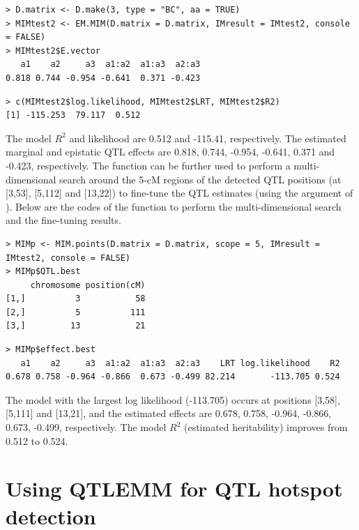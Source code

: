 \begin{verbatim}
> D.matrix <- D.make(3, type = "BC", aa = TRUE)
> MIMtest2 <- EM.MIM(D.matrix = D.matrix, IMresult = IMtest2, console = FALSE)
> MIMtest2$E.vector
   a1    a2     a3  a1:a2  a1:a3  a2:a3
0.818 0.744 -0.954 -0.641  0.371 -0.423
\end{verbatim}

\begin{verbatim}
> c(MIMtest2$log.likelihood, MIMtest2$LRT, MIMtest2$R2)
[1] -115.253  79.117  0.512
\end{verbatim}

\noindent The model $R^{2}$ and likelihood are 0.512 and -115.41, respectively. The estimated marginal and epistatic QTL effects are 0.818, 0.744, -0.954, -0.641, 0.371 and -0.423, respectively. The  function can be further used to perform a multi-dimensional search around the 5-cM regions of the detected QTL positions (at [3,53], [5,112] and [13,22]) to fine-tune the QTL estimates (using the argument of ). Below are the codes of the  function to perform the multi-dimensional search and the fine-tuning results.

\begin{verbatim}
> MIMp <- MIM.points(D.matrix = D.matrix, scope = 5, IMresult = IMtest2, console = FALSE)
> MIMp$QTL.best
     chromosome position(cM)
[1,]          3           58
[2,]          5          111
[3,]         13           21
\end{verbatim}

\begin{verbatim}
> MIMp$effect.best
   a1    a2     a3  a1:a2  a1:a3  a2:a3    LRT log.likelihood    R2
0.678 0.758 -0.964 -0.866  0.673 -0.499 82.214       -113.705 0.524
\end{verbatim}

\noindent The model with the largest log likelihood (-113.705) occurs at positions [3,58], [5,111] and [13,21], and the estimated effects are 0.678, 0.758, -0.964, -0.866, 0.673, -0.499, respectively. The model $R^{2}$ (estimated heritability) improves from 0.512 to 0.524. 

\section{Using QTLEMM for QTL hotspot detection}

